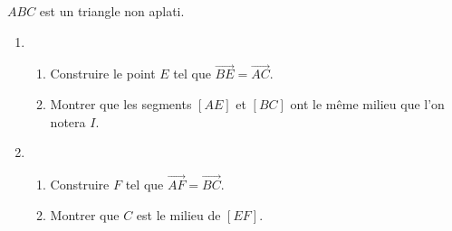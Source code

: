 
$ABC$ est un triangle non aplati.
\begin{enumerate}
\item 
\begin{enumerate}
\item  Construire le point $E$ tel que  $\overrightarrow{BE}=\overrightarrow{AC}$.
\item  Montrer que les segments $[AE]$ et $[BC]$ ont le même milieu que l'on notera $I$.
\end{enumerate}
\item 
\begin{enumerate}
\item Construire $F$ tel que $\overrightarrow{AF}=\overrightarrow{BC}$.
\item Montrer que $C$ est le milieu de $[EF]$.
\end{enumerate}
\end{enumerate}